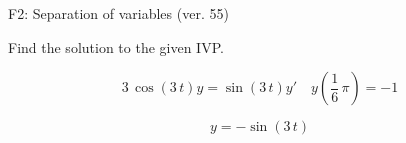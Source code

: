 \begin{exercise}
  \begin{exerciseTitle}F2: Separation of variables (ver. 55)\end{exerciseTitle}
  \begin{exerciseStatement}
    
Find the solution to the given IVP.

    
\[3 \, \cos\left(3 \, t\right) y= \sin\left(3 \, t\right) y'\hspace{1em} y\left( \frac{1}{6} \, \pi \right)= -1\]

  \end{exerciseStatement}
  \begin{exerciseAnswer}
    
\[y= -\sin\left(3 \, t\right)\]

  \end{exerciseAnswer}
\end{exercise}